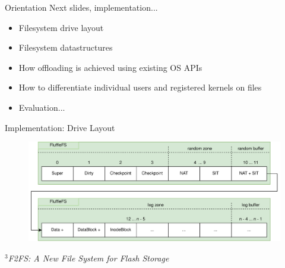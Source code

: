 \documentclass{beamer}
\begin{document}
\begin{frame}{Orientation}
	\begingroup
	\small Next slides, implementation...
	\begin{itemize}
		\item Filesystem drive layout
		\item Filesystem datastructures
		\item How offloading is achieved using existing OS APIs
		\item How to differentiate individual users and registered kernels on files
		\item Evaluation...
	\end{itemize}
	\endgroup
\end{frame}

\begin{frame}{Implementation: Drive Layout}
	\begingroup
	\small
	\begin{figure}[h]
		\centering
			  \includegraphics[width=1.0\linewidth]{resources/images/fluffle-layout-complete.png}
	\end{figure}
	\textit{\tiny $^{3}$F2FS: A New File System for Flash Storage}
	\endgroup
\end{frame}
\end{document}
